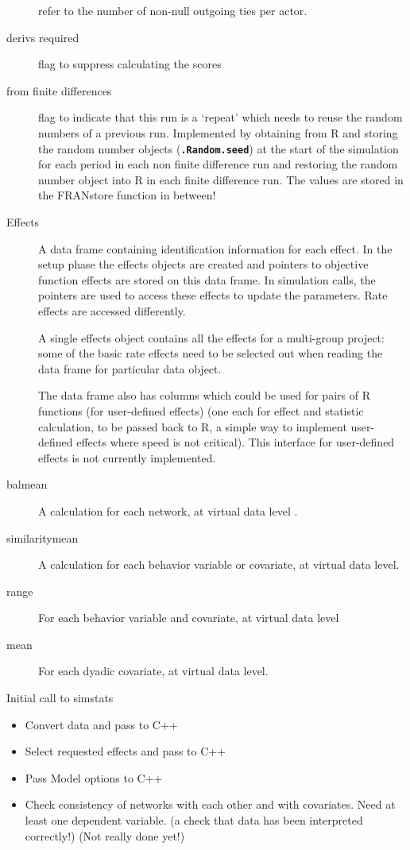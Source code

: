 \documentclass[12pt,a4paper]{article}
\makeatletter
\renewcommand{\=}{\,=\,}
\newcommand{\+}{\,+\,}
\newcommand{\nm}[1]{\textsf{\small #1}}
\newcommand{\R}{{\sf R }}
\newcommand{\sfn}[1]{\textbf{\texttt{#1}}}
\renewcommand{\section}{\@startsection{section}{1}
                {0pt}{\baselineskip}{0.5\baselineskip}
                {\centering\sffamily} }
\makeatother
\begin{document}
\begin{description}
  refer to the number of non-null outgoing ties per actor.
\item[derivs required] flag to suppress calculating the scores
\item[from finite differences] flag to indicate that this run is a `repeat'
  which needs to reuse the random numbers of a previous run. Implemented by
  obtaining from \R and storing the random number objects (\sfn{.Random.seed})
  at the start of the simulation for each period in each non finite difference
  run and restoring the random number object into \R in each finite difference
  run. The values are stored in the \nm{FRANstore} function in between!
\item [Effects] A data frame containing identification information for
  each effect. In the setup phase the effects objects are created and pointers
  to objective function effects are stored on this data frame. In simulation
  calls, the pointers are used to access these effects to update the
  parameters. Rate effects are accessed differently.

  A single effects object contains all the effects for a multi-group project:
  some of the basic rate effects need to be selected out when reading the data
  frame for particular data object.

  The data frame also has columns which could be used for pairs of R functions
  (for user-defined effects) (one each for effect and statistic calculation, to
  be passed back to R, a simple way to implement user-defined effects where
  speed is not critical). This interface for user-defined effects is not
  currently implemented.
\item[balmean] A calculation for each network, at virtual data level .
\item[similaritymean] A calculation for each behavior variable or covariate, at
  virtual data level.
\item[range] For each behavior variable and covariate, at virtual data level
\item[mean] For each dyadic covariate, at virtual data level.
\end{description}
\section{Initial call to simstats}
\begin{itemize}
\item Convert data and pass to C++
\item Select requested effects and pass to C++
\item Pass Model options to C++
\item Check consistency of networks with each other and with covariates. Need at
  least one dependent variable. (a check that data has been interpreted
  correctly!) (Not really done yet!)
\end{itemize}
\end{document}
